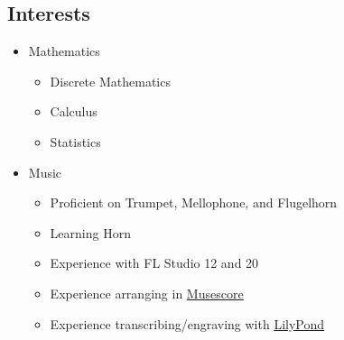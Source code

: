 \documentclass[12pt, twocolumn]{article}
\begin{document}
{			\subsection*{Interests}
				\begin{itemize}
					\item
						Mathematics
						\begin{itemize}[leftmargin = 13.5pt]
							\item
								Discrete Mathematics
							\item
								Calculus
							\item
								Statistics
						\end{itemize}
					\item
						Music
						\begin{itemize}[leftmargin = 13.5pt]
							\item
								Proficient on Trumpet, Mellophone, and Flugelhorn
							\item
								Learning Horn
							\item
								Experience with FL Studio 12 and 20
							\item
								Experience arranging in \href{https://musescore.com/user/31144332/scores/7683791/s/-ez0DL?share=copy_link}{\underline{Musescore}}
							\item
								Experience transcribing/engraving with \href{https://github.com/Endolite/LilyPond}{\underline{LilyPond}}
						\end{itemize}
				\end{itemize}
	}
\end{document}
